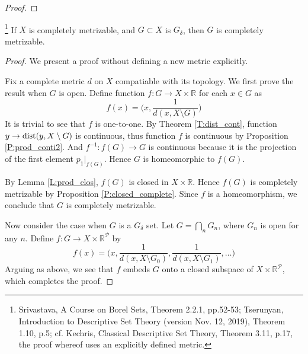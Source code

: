 \begin{proof}

\end{proof}

\begin{theorem} \label{T:gdelta_metri}
  \footnote{
    Srivastava, A Course on Borel Sets, Theorem 2.2.1, pp.52-53;
    Tserunyan, Introduction to Descriptive Set Theory (version Nov.
    12, 2019), Theorem 1.10, p.5; 
    cf. Kechris, Classical Descriptive Set Theory, Theorem 3.11, p.17,
    the proof whereof uses an explicitly defined metric.
  }
If $X$ is completely metrizable, and $G\subset X$ is $G_{\delta}$,
then $G$ is completely metrizable.
\end{theorem}
\begin{proof}
We present a proof without defining a new metric explicitly.

Fix a complete metric $d$ on $X$ compatiable with its topology. We first
prove the result when $G$ is open. Define function 
$f:G\to X\times\mathbb{R}$ for each $x\in G$ as
\[
  f(x) = \Big( x, \frac{1}{d(x,X\setminus G)} \Big)
\]
It is trivial to see that $f$ is one-to-one. By Theorem \ref{T:dist_cont},
function $y\to \operatorname*{dist} (y,X\setminus G)$ is continuous, thus function $f$
is continuous by Proposition \ref{P:prod_conti2}. And $f^{-1}:f(G)\to G$
is continuous because it is the projection of the first element
$p_1|_{f(G)}$. Hence $G$ is homeomorphic to $f(G)$.

By Lemma \ref{L:prod_clos}, $f(G)$ is closed in $X\times\mathbb{R}$.
Hence $f(G)$ is completely metrizable by Proposition \ref{P:closed_complete}.
Since $f$ is a homeomorphism, we conclude that $G$ is completely metrizable.

Now consider the case when $G$ is a $G_{\delta}$ set. Let $G=\bigcap_n G_n$, where
$G_n$ is open for any $n$. Define $f:G\to X\times\mathbb{R}^{\mathcal{P}}$ by
\[
  f(x) = \Big( x, \frac{1}{d(x,X\setminus G_0)}, \frac{1}{d(x,X\setminus G_1)}, 
           \dots \Big)
\]
Arguing as above, we see that $f$ embeds $G$ onto a closed subspace of
$X\times\mathbb{R}^{\mathcal{P}}$, which completes the proof.
\end{proof}

